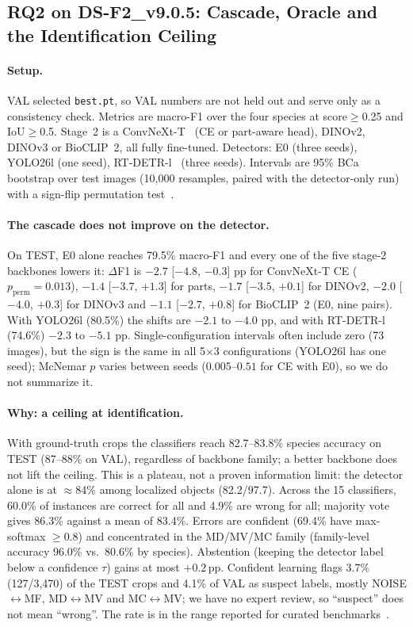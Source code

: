 \subsection{RQ2 on DS-F2\_v9.0.5: Cascade, Oracle and the Identification Ceiling}
\label{sec:exp:rq2v9}


\paragraph{Setup.} VAL selected \texttt{best.pt}, so VAL numbers are not held out and serve only as a consistency check. Metrics are macro-F1 over the four species at score$\ge$0.25 and IoU$\ge$0.5. Stage~2 is a ConvNeXt-T~\cite{liu2022convnext} (CE or part-aware head), DINOv2, DINOv3 or BioCLIP~2, all fully fine-tuned. Detectors: E0 (three seeds), YOLO26l (one seed), RT-DETR-l~\cite{zhao2024rtdetr} (three seeds). Intervals are 95\% BCa bootstrap over test images (10{,}000 resamples, paired with the detector-only run) with a sign-flip permutation test~\cite{du2025pairedbootstrap}.

\paragraph{The cascade does not improve on the detector.} On TEST, E0 alone reaches 79.5\% macro-F1 and every one of the five stage-2 backbones lowers it: $\Delta$F1 is $-2.7$ [$-4.8$, $-0.3$] pp for ConvNeXt-T CE ($p_{\text{perm}}=0.013$), $-1.4$ [$-3.7$, $+1.3$] for parts, $-1.7$ [$-3.5$, $+0.1$] for DINOv2, $-2.0$ [$-4.0$, $+0.3$] for DINOv3 and $-1.1$ [$-2.7$, $+0.8$] for BioCLIP~2 (E0, nine pairs). With YOLO26l (80.5\%) the shifts are $-2.1$ to $-4.0$ pp, and with RT-DETR-l (74.6\%) $-2.3$ to $-5.1$ pp. Single-configuration intervals often include zero (73 images), but the sign is the same in all 5$\times$3 configurations (YOLO26l has one seed); McNemar $p$ varies between seeds ($0.005$--$0.51$ for CE with E0), so we do not summarize it.

\paragraph{Why: a ceiling at identification.} With ground-truth crops the classifiers reach 82.7--83.8\% species accuracy on TEST (87--88\% on VAL), regardless of backbone family; a better backbone does not lift the ceiling. This is a plateau, not a proven information limit: the detector alone is at $\approx$84\% among localized objects (82.2/97.7). Across the 15 classifiers, 60.0\% of instances are correct for all and 4.9\% are wrong for all; majority vote gives 86.3\% against a mean of 83.4\%. Errors are confident (69.4\% have max-softmax $\ge0.8$) and concentrated in the MD/MV/MC family (family-level accuracy 96.0\% vs.\ 80.6\% by species). Abstention (keeping the detector label below a confidence $\tau$) gains at most $+0.2$\,pp. Confident learning flags 3.7\% (127/3{,}470) of the TEST crops and 4.1\% of VAL as suspect labels, mostly NOISE$\leftrightarrow$MF, MD$\leftrightarrow$MV and MC$\leftrightarrow$MV; we have no expert review, so ``suspect'' does not mean ``wrong''. The rate is in the range reported for curated benchmarks~\cite{northcutt2021pervasive}.

